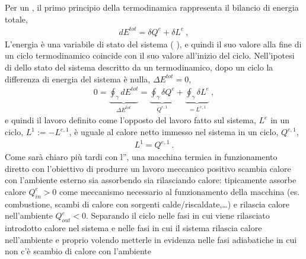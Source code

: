 \documentclass[letterpaper,10pt,italian]{jupyterBook}
\begin{document}
\sphinxAtStartPar
Per un , il primo principio della termodinamica rappresenta il bilancio di energia totale,
\begin{equation*}
\begin{split}d E^{tot} = \delta Q^e + \delta L^e \ ,\end{split}
\end{equation*}
\sphinxAtStartPar
L’energia è una variabile di stato del sistema ( ), e quindi il suo valore alla fine di un ciclo termodinamico coincide con il suo valore all’inizio del ciclo. Nell’ipotesi di  dello stato del sistema descritto da un  termodinamico, dopo un ciclo la differenza di energia del sistema è nulla, \(\Delta E^{tot} = 0\),
\begin{equation*}
\begin{split}0 = \underbrace{ \oint_\gamma d E^{tot} }_{\Delta E^{tot}} = \underbrace{\oint_\gamma \delta Q^e}_{Q^{e,1}} + \underbrace{\oint_\gamma \delta L^e}_{= L^{e,1}} \ ,\end{split}
\end{equation*}
\sphinxAtStartPar
e quindi il lavoro  \sphinxhyphen{} definito come l’opposto del lavoro fatto sul sistema, \(L^e\) \sphinxhyphen{} in un ciclo, \(L^1 := -L^{e,1}\), è uguale al calore netto immesso nel sistema in un ciclo, \(Q^{e,1}\),
\begin{equation*}
\begin{split}L^{1} = Q^{e,1} \ .\end{split}
\end{equation*}
\sphinxAtStartPar
Come sarà chiaro più tardi con l”{\hyperref[\detokenize{ch/thermodynamics/heat-engine-second-principle:physics-hs-thermodynamics-heat-engine-second-principle-kelvin}]{}}, una macchina termica in funzionamento diretto \sphinxhyphen{} con l’obiettivo di produrre un lavoro meccanico positivo \sphinxhyphen{} scambia calore con l’ambiente esterno sia assorbendo sia rilasciando calore: tipicamente assorbe calore \(Q^{e}_{in} > 0\) come meccanismo necessario al funzionamento della macchina (es. combustione, scambi di calore con sorgenti calde/riscaldate,…) e rilascia calore nell’ambiente \(Q^{e}_{out} < 0\). Separando il ciclo nelle fasi in cui viene rilasciato introdotto calore nel sistema e nelle fasi in cui il sistema rilascia calore nell’ambiente e \sphinxhyphen{} proprio volendo metterle in evidenza \sphinxhyphen{} nelle fasi adiabatiche in cui non c’è scambio di calore con l’ambiente
\end{document}
